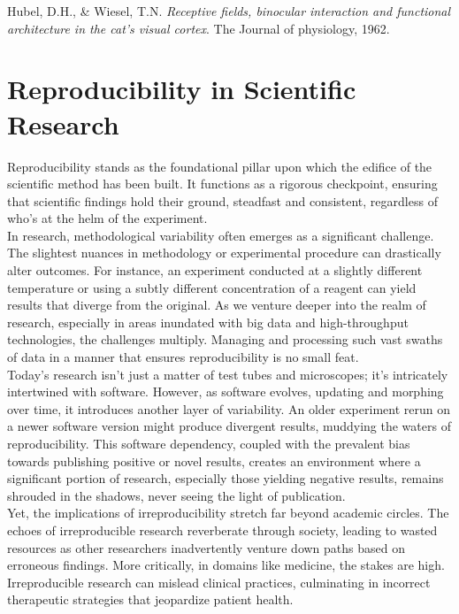 Hubel, D.H., \& Wiesel, T.N.
\textit{Receptive fields, binocular interaction and functional architecture in the cat's visual cortex}.
The Journal of physiology, 1962.

\section{Reproducibility in Scientific Research}

Reproducibility stands as the foundational pillar upon which the edifice of the scientific method has been built. It functions as a rigorous checkpoint, ensuring that scientific findings hold their ground, steadfast and consistent, regardless of who's at the helm of the experiment.\\

In research, methodological variability often emerges as a significant challenge. The slightest nuances in methodology or experimental procedure can drastically alter outcomes. For instance, an experiment conducted at a slightly different temperature or using a subtly different concentration of a reagent can yield results that diverge from the original. As we venture deeper into the realm of research, especially in areas inundated with big data and high-throughput technologies, the challenges multiply. Managing and processing such vast swaths of data in a manner that ensures reproducibility is no small feat.\\

Today's research isn't just a matter of test tubes and microscopes; it's intricately intertwined with software. However, as software evolves, updating and morphing over time, it introduces another layer of variability. An older experiment rerun on a newer software version might produce divergent results, muddying the waters of reproducibility. This software dependency, coupled with the prevalent bias towards publishing positive or novel results, creates an environment where a significant portion of research, especially those yielding negative results, remains shrouded in the shadows, never seeing the light of publication.\\

Yet, the implications of irreproducibility stretch far beyond academic circles. The echoes of irreproducible research reverberate through society, leading to wasted resources as other researchers inadvertently venture down paths based on erroneous findings. More critically, in domains like medicine, the stakes are high. Irreproducible research can mislead clinical practices, culminating in incorrect therapeutic strategies that jeopardize patient health.\\\\\\

